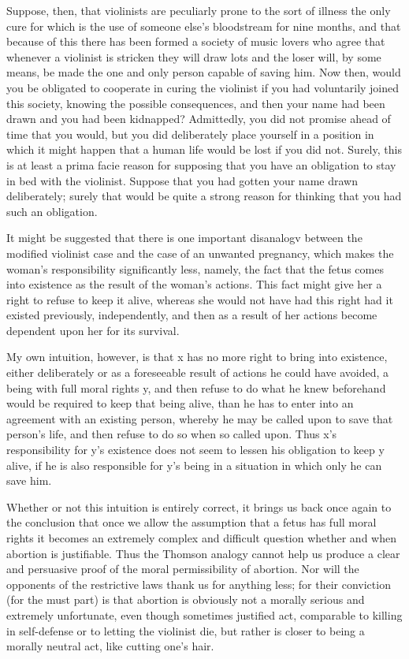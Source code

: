 Suppose, then, that violinists are peculiarly prone to the
sort of illness the only cure for which is the use of
someone else’s bloodstream for nine months, and that
because of this there has been formed a society of music
lovers who agree that whenever a violinist is stricken they
will draw lots and the loser will, by some means, be made
the one and only person capable of saving him. Now then,
would you be obligated to cooperate in curing the
violinist if you had voluntarily joined this society,
knowing the possible consequences, and then your name
had been drawn and you had been kidnapped?
Admittedly, you did not promise ahead of time that you
would, but you did deliberately place yourself in a
position in which it might happen that a human life would
be lost if you did not. Surely, this is at least a prima facie
reason for supposing that you have an obligation to stay in
bed with the violinist. Suppose that you had gotten your
name drawn deliberately; surely that would be quite a
strong reason for thinking that you had such an obligation.

It might be suggested that there is one important
disanalogv between the modified violinist case and the
case of an unwanted pregnancy, which makes the
woman’s responsibility significantly less, namely, the fact
that the fetus comes into existence as the result of the
woman’s actions. This fact might give her a right to
refuse to keep it alive, whereas she would not have had
this right had it existed previously, independently, and
then as a result of her actions become dependent upon her
for its survival.

My own intuition, however, is that x has no more right to
bring into existence, either deliberately or as a foreseeable
result of actions he could have avoided, a being with full
moral rights y, and then refuse to do what he knew
beforehand would be required to keep that being alive,
than he has to enter into an agreement with an existing
person, whereby he may be called upon to save that
person’s life, and then refuse to do so when so called 
upon. Thus x’s responsibility for y’s existence does not
seem to lessen his obligation to keep y alive, if he is also
responsible for y’s being in a situation in which only he
can save him.

Whether or not this intuition is entirely correct, it brings
us back once again to the conclusion that once we allow
the assumption that a fetus has full moral rights it
becomes an extremely complex and difficult question
whether and when abortion is justifiable. Thus the
Thomson analogy cannot help us produce a clear and
persuasive proof of the moral permissibility of abortion.
Nor will the opponents of the restrictive laws thank us for
anything less; for their conviction (for the must part) is
that abortion is obviously not a morally serious and
extremely unfortunate, even though sometimes justified
act, comparable to killing in self-defense or to letting the
violinist die, but rather is closer to being a morally neutral
act, like cutting one’s hair.

